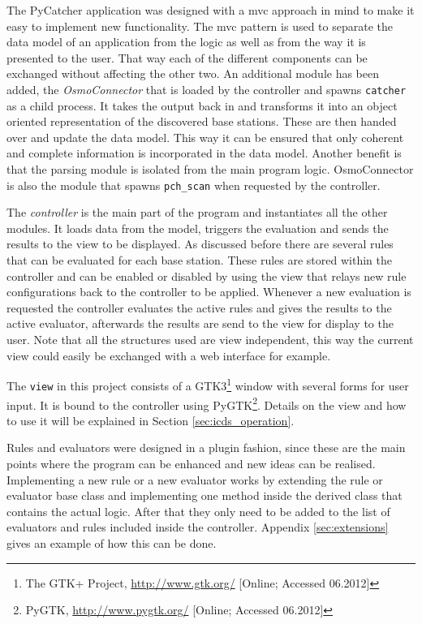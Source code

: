 The PyCatcher application was designed with a \gls{mvc} approach in mind to make it easy to implement new functionality.
The \gls{mvc} pattern is used to separate the data model of an application from the logic as well as from the way it is presented to the user.
That way each of the different components can be exchanged without affecting the other two.
An additional module has been added, the \emph{OsmoConnector} that is loaded by the controller and spawns \texttt{catcher} as a child process.
It takes the output back in and transforms it into an object oriented representation of the discovered base stations.
These are then handed over and update the data model.
This way it can be ensured that only coherent and complete information is incorporated in the data model.
Another benefit is that the parsing module is isolated from the main program logic.
OsmoConnector is also the module that spawns \texttt{pch\_scan} when requested by the controller.

The \emph{controller} is the main part of the program and instantiates all the other modules.
It loads data from the model, triggers the evaluation and sends the results to the view to be displayed.
As discussed before there are several rules that can be evaluated for each base station.
These rules are stored within the controller and can be enabled or disabled by using the view that relays new rule configurations back to the controller to be applied. 
Whenever a new evaluation is requested the controller evaluates the active rules and gives the results to the active evaluator, afterwards the results are send to the view for display to the user.
Note that all the structures used are view independent, this way the current view could easily be exchanged with a web interface for example.

The \texttt{view} in this project consists of a GTK3\footnote{The GTK+ Project, \url{http://www.gtk.org/} [Online; Accessed 06.2012]} window with several forms for user input.
It is bound to the controller using PyGTK\footnote{PyGTK, \url{http://www.pygtk.org/} [Online; Accessed 06.2012]}.
Details on the view and how to use it will be explained in Section \ref{sec:icds_operation}.

Rules and evaluators were designed in a plugin fashion, since these are the main points where the program can be enhanced and new ideas can be realised.
Implementing a new rule or a new evaluator works by extending the rule or evaluator base class and implementing one method inside the derived class that contains the actual logic.
After that they only need to be added to the list of evaluators and rules included inside the controller.
Appendix \ref{sec:extensions} gives an example of how this can be done.

